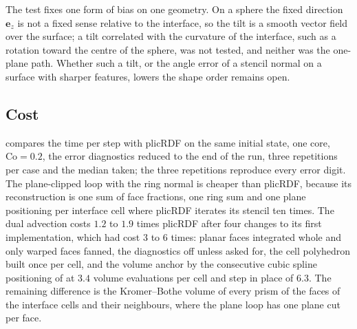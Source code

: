 \documentclass[preprint,12pt]{elsarticle}
\newcommand{\nSk}{\mathbf{n}_{\tilde{\Sigma}_k}}
\begin{document}
\begin{table}[htbp]
\centering
\caption{The bias test: the ring normal rotated by $\theta_b = c\,h/R$ about $\mathbf{e}_z\times\nSk$, biased (one sense relative to $\mathbf{e}_z$ in every cell) or alternating (the sign by the parity of the cell's index sum), against the ring normal (first row of each block), the oblique translation and the rotation, $N = 32$, $64$, $128$, 8 ranks, as \cref{tab:normal-order}. The orders are least squares over $N$; the two ratios are those of the tilted normal to the ring normal in $L_1(\theta)$ at $N = 32$ and in $E_{\mathrm{shape}}$ at $N = 128$; wall: seconds at $N = 128$ on shared nodes. The position diagnostic is on in all rows of this table except the ring rows. Body generated by \texttt{make\_table\_bias.py}.}
\label{tab:bias}
\footnotesize
\setlength{\tabcolsep}{3pt}
\resizebox{\linewidth}{!}{}
\end{table}

The test fixes one form of bias on one geometry. On a sphere the fixed direction $\mathbf{e}_z$ is not a fixed sense relative to the interface, so the tilt is a smooth vector field over the surface; a tilt correlated with the curvature of the interface, such as a rotation toward the centre of the sphere, was not tested, and neither was the one-plane path. Whether such a tilt, or the angle error of a stencil normal on a surface with sharper features, lowers the shape order remains open.

\subsection{Cost}
\label{sec:tpf-cost}

 compares the time per step with plicRDF on the same initial state, one core, $\mathrm{Co} = 0.2$, the error diagnostics reduced to the end of the run, three repetitions per case and the median taken; the three repetitions reproduce every error digit. The plane-clipped loop with the ring normal is cheaper than plicRDF, because its reconstruction is one sum of face fractions, one ring sum and one plane positioning per interface cell where plicRDF iterates its stencil ten times. The dual advection costs $1.2$ to $1.9$ times plicRDF after four changes to its first implementation, which had cost $3$ to $6$ times: planar faces integrated whole and only warped faces fanned, the diagnostics off unless asked for, the cell polyhedron built once per cell, and the volume anchor by the consecutive cubic spline positioning of \citet{Maric2021CCS} at $3.4$ volume evaluations per cell and step in place of $6.3$. The remaining difference is the Kromer--Bothe volume of every prism of the faces of the interface cells and their neighbours, where the plane loop has one plane cut per face.
\end{document}
